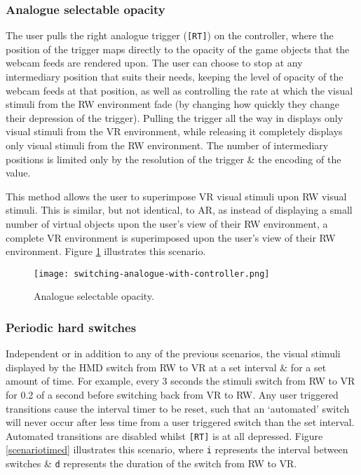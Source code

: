 \subsubsection{Analogue selectable opacity}
The user pulls the right analogue trigger (\texttt{[RT]}) on the controller, where the position of the trigger maps directly to the opacity of the game objects that the webcam feeds are rendered upon. The user can choose to stop at any intermediary position that suits their needs, keeping the level of opacity of the webcam feeds at that position, as well as controlling the rate at which the visual stimuli from the RW environment fade (by changing how quickly they change their depression of the trigger). Pulling the trigger all the way in displays only visual stimuli from the VR environment, while releasing it completely displays only visual stimuli from the RW environment. The number of intermediary positions is limited only by the resolution of the trigger \& the encoding of the value.

This method allows the user to superimpose VR visual stimuli upon RW visual stimuli. This is similar, but not identical, to AR, as instead of displaying a small number of virtual objects upon the user's view of their RW environment, a complete VR environment is superimposed upon the user's view of their RW environment. Figure \ref{scenario2} illustrates this scenario.

\begin{figure}[h]
	\begin{center}
		\texttt{[image: switching-analogue-with-controller.png]}
		\caption{Analogue selectable opacity.}
		\label{scenario2}
	\end{center}
\end{figure}


\subsubsection{Periodic hard switches}
\label{subsub-periodic}
Independent or in addition to any of the previous scenarios, the visual stimuli displayed by the HMD switch from RW to VR at a set interval \& for a set amount of time. For example, every 3 seconds the stimuli switch from RW to VR for 0.2 of a second before switching back from VR to RW. Any user triggered transitions cause the interval timer to be reset, such that an `automated' switch will never occur after less time from a user triggered switch than the set interval. Automated transitions are disabled whilst \texttt{[RT]} is at all depressed. Figure \ref{scenariotimed} illustrates this scenario, where \texttt{i} represents the interval between switches \& \texttt{d} represents the duration of the switch from RW to VR.

